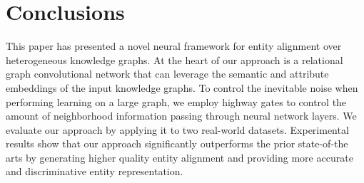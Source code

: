 
	
                       \section{Conclusions} This paper has presented a novel neural framework for entity alignment over heterogeneous
                       knowledge graphs. At the heart of our approach is a relational graph convolutional network that can leverage the
                       semantic and attribute embeddings of the input knowledge graphs. To control the inevitable noise when performing
                       learning on a large graph, we employ highway gates to control the amount of neighborhood information passing through
                       neural network layers. We evaluate our approach by applying it to two real-world datasets. Experimental results show
                       that our approach significantly outperforms the prior state-of-the arts by generating higher quality entity
                       alignment and providing more accurate and discriminative entity representation.
